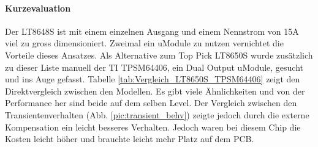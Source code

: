 {\paragraph{Kurzevaluation}Der LT8648S ist mit einem einzelnen Ausgang und einem Nennstrom von 15A viel zu gross dimensioniert. Zweimal ein uModule zu nutzen vernichtet die Vorteile dieses Ansatzes. Als Alternative zum Top Pick LT8650S wurde zusätzlich zu dieser Liste manuell der TI TPSM64406, ein Dual Output uModule, gesucht und ins Auge gefasst. Tabelle \ref{tab:Vergleich_LT8650S_TPSM64406} zeigt den Direktvergleich zwischen den Modellen. Es gibt viele Ähnlichkeiten und von der Performance her sind beide auf dem selben Level. Der Vergleich zwischen den Transientenverhalten (Abb. \ref{pic:transient_behv}) zeigte jedoch durch die externe Kompensation ein leicht besseres Verhalten. Jedoch waren bei diesem Chip die Kosten leicht höher und brauchte leicht mehr Platz auf dem PCB.
}
